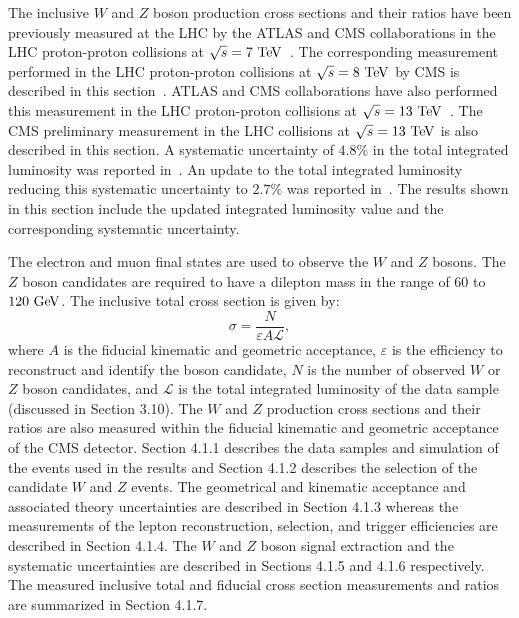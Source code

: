 The inclusive $W$ and $Z$ boson production cross sections and their ratios have been previously measured at the LHC by the ATLAS and CMS collaborations in the LHC proton-proton collisions at $\sqrt{s}=7~\mathrm{Te\kern -0.1em V}$~\cite{CMS:2011aa,Chatrchyan:2011nv,Aad:2011dm}. The corresponding measurement performed in the LHC proton-proton collisions at $\sqrt{s}=8~\mathrm{Te\kern -0.1em V}$ by CMS is described in this section~\cite{Chatrchyan:2014mua}. ATLAS and CMS collaborations have also performed this measurement in the LHC proton-proton collisions at $\sqrt{s}=13~\mathrm{Te\kern -0.1em V}$~\cite{CMS-PAS-SMP-15-004,Aad:2016naf}. The CMS preliminary measurement in the LHC collisions at $\sqrt{s}=13~\mathrm{Te\kern -0.1em V}$ is also described in this section. A systematic uncertainty of $4.8\%$ in the total integrated luminosity was reported in~\cite{CMS-PAS-SMP-15-004}. An update to the total integrated luminosity  reducing this systematic uncertainty to $2.7\%$ was reported in~\cite{CMS-PAS-LUM-15-001}. The results shown in this section include the updated integrated luminosity value and the corresponding systematic uncertainty.

The electron and muon final states are used to observe the $W$ and $Z$ bosons. The $Z$ boson candidates are required to have a dilepton mass in the range of $60$ to $120~\mathrm{Ge\kern -0.1em V}$. The inclusive total cross section is given by:  
\begin{equation} \label{eq:xsec2}
\sigma = \frac{N}{\varepsilon A \mathcal{L}},
\end{equation}
where $A$ is the fiducial kinematic and geometric acceptance, $\varepsilon$ is the efficiency to reconstruct and identify the boson candidate, $N$ is the number of observed $W$ or $Z$ boson candidates, and $\mathcal{L}$ is the total integrated luminosity of the data sample (discussed in Section 3.10).  The $W$ and $Z$ production cross sections and their ratios are also measured within the fiducial kinematic and geometric acceptance of the CMS detector.  Section 4.1.1 describes the data samples and simulation of the events used in the results and Section 4.1.2 describes the selection of the candidate $W$ and $Z$ events. The geometrical and kinematic acceptance and associated theory uncertainties are described in Section 4.1.3 whereas the measurements of the lepton reconstruction, selection, and trigger efficiencies are described in Section 4.1.4. The $W$ and $Z$ boson signal extraction and the systematic uncertainties are described in Sections 4.1.5 and 4.1.6 respectively.  The measured inclusive total and fiducial cross section measurements and ratios are summarized in Section 4.1.7.  

